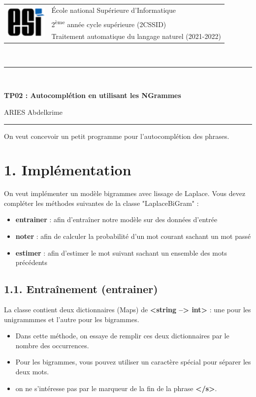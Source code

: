 \documentclass[11pt, a4paper]{article}
\begin{document}

\noindent
\begin{tabular}{ll}
\multirow{3}{*}{\includegraphics[width=2cm]{../../../img/esi-logo.png}} & \'Ecole national Supérieure d'Informatique\\
& 2\textsuperscript{ème} année cycle supérieure (2CSSID)\\
& Traitement automatique du langage naturel (2021-2022)
\end{tabular}\\[.25cm]
\noindent\rule{\textwidth}{1pt}\\%
\begin{center}
{\LARGE \textbf{TP02 : Autocomplétion en utilisant les NGrammes}}
\begin{flushright}
	ARIES Abdelkrime
\end{flushright}
\end{center}
\noindent\rule{\textwidth}{1pt}

On veut concevoir un petit programme pour l'autocomplétion des phrases. 


\section*{1. Implémentation}

On veut implémenter un modèle bigrammes avec lissage de Laplace. 
Vous devez compléter les méthodes suivantes de la classe "LaplaceBiGram" : 
\begin{itemize}
	\item \textbf{entrainer} : afin d'entraîner notre modèle sur des données d'entrée
	\item \textbf{noter} : afin de calculer la probabilité d'un mot courant sachant un mot passé
	\item \textbf{estimer} : afin d'estimer le mot suivant sachant un ensemble des mots précédents
\end{itemize}

\subsection*{1.1. Entraînement (entrainer)}

La classe contient deux dictionnaires (Maps) de \textbf{\textless string --> int\textgreater} : une pour les unigrammmes et l'autre pour les bigrammes.
\begin{itemize}
	\item Dans cette méthode, on essaye de remplir ces deux dictionnaires par le nombre des occurrences.
	\item Pour les bigrammes, vous pouvez utiliser un caractère spécial pour séparer les deux mots.
	\item on ne s'intéresse pas par le marqueur de la fin de la phrase \textbf{\textless /s\textgreater}.
\end{itemize} 
\end{document}

